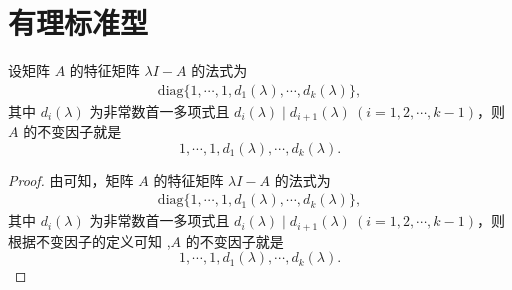 \documentclass[../../main.tex]{subfiles}%
\begin{document}
\section{有理标准型}\label{section:有理标准型}

\begin{proposition}\label{proposition:特征矩阵的法式和不变因子}
设矩阵 $A$ 的特征矩阵 $\lambda I - A$ 的法式为
\begin{align*}
\mathrm{diag}\{1,\cdots,1,d_1(\lambda),\cdots,d_k(\lambda)\},
\end{align*}
其中 $d_i(\lambda)$ 为非常数首一多项式且 $d_i(\lambda)\mid d_{i + 1}(\lambda)\ (i = 1, 2, \cdots, k - 1)$，则 $A$ 的不变因子就是
\[
1,\cdots,1,d_1(\lambda),\cdots,d_k(\lambda).
\] 
\end{proposition}
\begin{proof}
由可知，矩阵 $A$ 的特征矩阵 $\lambda I - A$ 的法式为
\begin{align*}
\mathrm{diag}\{1,\cdots,1,d_1(\lambda),\cdots,d_k(\lambda)\},
\end{align*}
其中 $d_i(\lambda)$ 为非常数首一多项式且 $d_i(\lambda)\mid d_{i + 1}(\lambda)\ (i = 1, 2, \cdots, k - 1)$，则根据不变因子的定义可知 ,$A$ 的不变因子就是
\[
1,\cdots,1,d_1(\lambda),\cdots,d_k(\lambda).
\] 
\end{proof}
\end{document}
